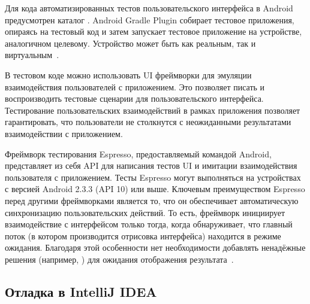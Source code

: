 Для кода автоматизированных тестов пользовательского интерфейса в Android предусмотрен каталог .
Android Gradle Plugin собирает тестовое приложения, опираясь на тестовый код и затем запускает тестовое приложение на устройстве, аналогичном целевому.
Устройство может быть как реальным, так и виртуальным~\cite{android:uiTesting}.

В тестовом коде можно использовать UI фреймворки для эмуляции взаимодействия пользователей с приложением.
Это позволяет писать и воспроизводить тестовые сценарии для пользовательского интерфейса.
Тестирование пользовательских взаимодействий в рамках приложения позволяет гарантировать, что пользователи не столкнутся с неожиданными результатами взаимодействии с приложением.

Фреймворк тестирования Espresso, предоставляемый командой Android, представляет из себя API для написания тестов UI и имитации взаимодействия пользователя с приложением.
Тесты Espresso могут выполняться на устройствах с версией Android 2.3.3 (API 10) или выше.
Ключевым преимуществом Espresso перед другими фреймворками является то, что он обеспечивает автоматическую синхронизацию пользовательских действий.
То есть, фреймворк инициирует взаимодействие с интерфейсом только тогда, когда обнаруживает, что главный поток (в котором производится отрисовка интерфейса) находится в режиме ожидания.
Благодаря этой особенности нет необходимости добавлять ненадёжные решения (например, ) для ожидания отображения результата~\cite{androidTesting}.

\subsection{Отладка в IntelliJ IDEA}
\label{subsec:debug}


\conclusions
\label{sec:techConclusions}


